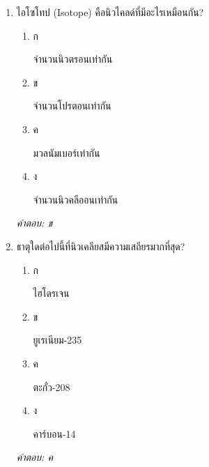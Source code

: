 \documentclass[12pt]{article}
\begin{document}
\begin{enumerate}[label=\arabic*., itemsep=0.5\baselineskip, topsep=0.5\baselineskip, leftmargin=*]
\item ไอโซโทป (Isotope) คือนิวไคลด์ที่มีอะไรเหมือนกัน?
\begin{enumerate}[label=\alph*)., itemsep=0.3\baselineskip, topsep=0.3\baselineskip]
\item ก\ 
\begin{minipage}[t]{0.9\linewidth}
\raggedright จำนวนนิวตรอนเท่ากัน
\end{minipage}
\item ข\ 
\begin{minipage}[t]{0.9\linewidth}
\raggedright จำนวนโปรตอนเท่ากัน
\end{minipage}
\item ค\ 
\begin{minipage}[t]{0.9\linewidth}
\raggedright มวลนัมเบอร์เท่ากัน
\end{minipage}
\item ง\ 
\begin{minipage}[t]{0.9\linewidth}
\raggedright จำนวนนิวคลีออนเท่ากัน
\end{minipage}
\end{enumerate}
\vspace{-0.3\baselineskip}
\begin{small}
\textit{คำตอบ: ข}
\end{small}

\item ธาตุใดต่อไปนี้ที่นิวเคลียสมีความเสถียรมากที่สุด?
\begin{enumerate}[label=\alph*)., itemsep=0.3\baselineskip, topsep=0.3\baselineskip]
\item ก\ 
\begin{minipage}[t]{0.9\linewidth}
\raggedright ไฮโดรเจน
\end{minipage}
\item ข\ 
\begin{minipage}[t]{0.9\linewidth}
\raggedright ยูเรเนียม-235
\end{minipage}
\item ค\ 
\begin{minipage}[t]{0.9\linewidth}
\raggedright ตะกั่ว-208
\end{minipage}
\item ง\ 
\begin{minipage}[t]{0.9\linewidth}
\raggedright คาร์บอน-14
\end{minipage}
\end{enumerate}
\vspace{-0.3\baselineskip}
\begin{small}
\textit{คำตอบ: ค}
\end{small}


\end{enumerate}
\end{document}
